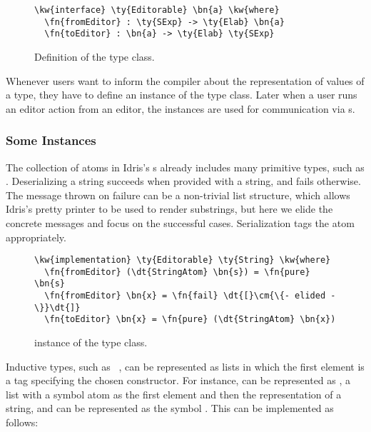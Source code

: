 \begin{figure}[H]
\begin{Verbatim}
\kw{interface} \ty{Editorable} \bn{a} \kw{where}
  \fn{fromEditor} : \ty{SExp} -> \ty{Elab} \bn{a}
  \fn{toEditor} : \bn{a} -> \ty{Elab} \ty{SExp}
\end{Verbatim}
\caption{Definition of the \Editorable{} type class.}
\label{code:editorable}
\end{figure}

Whenever users want to inform the compiler about the \sexp{}
representation of values of a type, they have to define an instance of the
\Editorable{} type class. Later when a user runs an editor action from an
editor, the \Editorable{} instances are used for communication via
\sexp{}s.

\subsubsection{Some \Editorable{} Instances}

The collection of atoms in Idris's \sexp{}s already includes many
primitive types, such as .  Deserializing a string succeeds
when provided with a string, and fails otherwise. The message thrown on failure can be a non-trivial list structure, which allows Idris's pretty printer to be used to render substrings, but here we elide the concrete messages and focus on the successful cases.
Serialization tags
the atom appropriately.

\begin{figure}[H]
\begin{Verbatim}
\kw{implementation} \ty{Editorable} \ty{String} \kw{where}
  \fn{fromEditor} (\dt{StringAtom} \bn{s}) = \fn{pure} \bn{s}
  \fn{fromEditor} \bn{x} = \fn{fail} \dt{[}\cm{\{- elided -\}}\dt{]}
  \fn{toEditor} \bn{x} = \fn{pure} (\dt{StringAtom} \bn{x})
\end{Verbatim}
\caption{ instance of the  type class.}
\label{code:editorableString}
\end{figure}

Inductive types, such as \mbox{ }, can be represented as lists in which the first element is a tag specifying the chosen constructor.
For instance,  can be represented as , a list
\sexp{} with a symbol atom as the first element and then the \sexp{}
representation of a string, and  can be represented as
the symbol . This can be implemented as follows:

